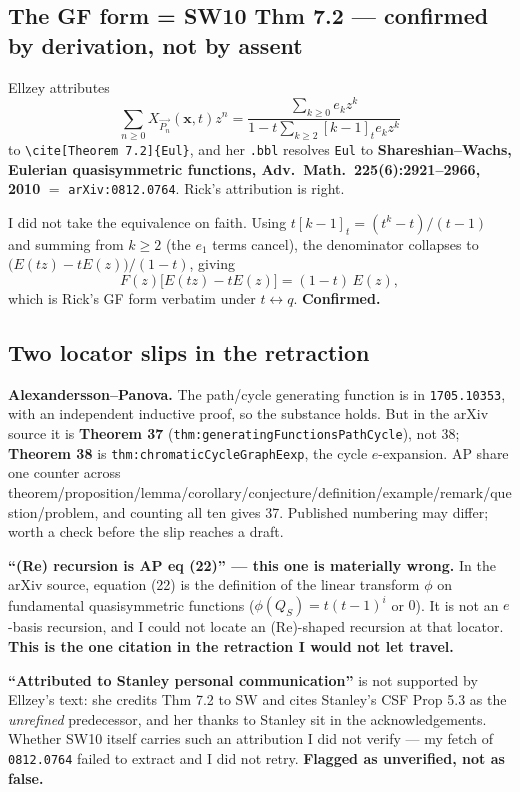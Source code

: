 \documentclass[11pt]{article}
\newcommand{\code}[1]{\texttt{#1}}
\begin{document}
\subsection{The GF form = SW10 Thm 7.2 --- confirmed by derivation, not by assent}

Ellzey attributes
\[
  \sum_{n\ge 0} X_{\overrightarrow{P_n}}(\mathbf{x},t)z^n
  = \frac{\sum_{k\ge 0} e_k z^k}{1 - t\sum_{k\ge 2}[k-1]_t e_k z^k}
\]
to \code{\textbackslash cite[Theorem 7.2]\{Eul\}}, and her \code{.bbl} resolves
\code{Eul} to \textbf{Shareshian--Wachs, Eulerian quasisymmetric functions, Adv.\ Math.\
225(6):2921--2966, 2010} $=$ \code{arXiv:0812.0764}. Rick's attribution is right.

I did not take the equivalence on faith. Using $t[k-1]_t = (t^k-t)/(t-1)$ and summing from
$k\ge 2$ (the $e_1$ terms cancel), the denominator collapses to
$\bigl(E(tz)-tE(z)\bigr)/(1-t)$, giving
\[
  F(z)\bigl[E(tz) - tE(z)\bigr] = (1-t)\,E(z),
\]
which is Rick's GF form verbatim under $t\leftrightarrow q$. \textbf{Confirmed.}

\subsection{Two locator slips in the retraction}

\textbf{Alexandersson--Panova.} The path/cycle generating function is in
\code{1705.10353}, with an independent inductive proof, so the substance holds. But in the
arXiv source it is \textbf{Theorem 37} (\code{thm:generatingFunctionsPathCycle}), not 38;
\textbf{Theorem 38} is \code{thm:chromaticCycleGraphEexp}, the cycle $e$-expansion. AP
share one counter across
theorem/proposition/lemma/corollary/conjecture/definition/example/remark/question/problem,
and counting all ten gives 37. Published numbering may differ; worth a check before the
slip reaches a draft.

\textbf{``(Re) recursion is AP eq (22)'' --- this one is materially wrong.} In the arXiv
source, equation (22) is the definition of the linear transform $\phi$ on fundamental
quasisymmetric functions ($\phi(Q_S) = t(t-1)^i$ or $0$). It is not an $e$-basis
recursion, and I could not locate an (Re)-shaped recursion at that locator.
\textbf{This is the one citation in the retraction I would not let travel.}

\textbf{``Attributed to Stanley personal communication''} is not supported by Ellzey's
text: she credits Thm 7.2 to SW and cites Stanley's CSF Prop 5.3 as the \emph{unrefined}
predecessor, and her thanks to Stanley sit in the acknowledgements. Whether SW10 itself
carries such an attribution I did not verify --- my fetch of \code{0812.0764} failed to
extract and I did not retry. \textbf{Flagged as unverified, not as false.}
\end{document}
